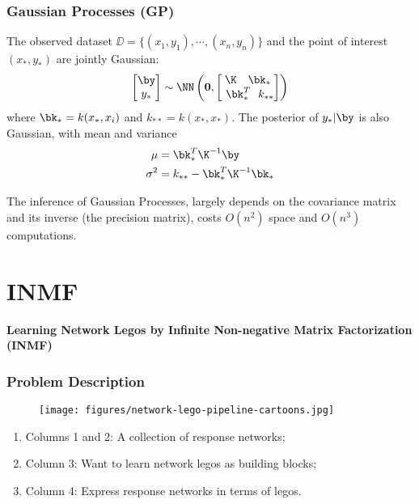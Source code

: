 \documentclass{beamer}
\begin{document}
\begin{frame}
\frametitle{Gaussian Processes (GP)}
The observed dataset $\DD = \{(x_1,y_1),\cdots,(x_n,y_n)\}$ and the point of interest $(x_*,y_*)$ are jointly Gaussian:
\begin{align}
	\begin{bmatrix}\by\\y_*\end{bmatrix} \sim \NN \left( \mathbf{0}, \begin{bmatrix}\K ~~~ \bk_*\\~\bk_*^T ~~k_{**}\end{bmatrix} \right)
\end{align}
where $\bk_* = k(x_*,x_i)$ and $k_{**} = k(x_*,x_*)$. The posterior of $y_*|\by$ is also Gaussian, with mean and variance
\begin{align}
	\mu &= \bk_*^T\K^{-1}\by\\
	\sigma^2 &= k_{**} - \bk_*^T\K^{-1}\bk_*
\end{align}

The inference of Gaussian Processes, largely depends on the covariance matrix and its inverse (the precision matrix), costs $O(n^2)$ space and $O(n^3)$ computations.
\end{frame}



\section{INMF}

\begin{frame}
\begin{center}
{\bf{Learning Network Legos by Infinite Non-negative Matrix Factorization (INMF)}}
\end{center}
\end{frame}

\begin{frame}
\frametitle{Problem Description}

\begin{figure}[c]
  \texttt{[image: figures/network-lego-pipeline-cartoons.jpg]}
\end{figure}

\begin{enumerate}
	\item Columns 1 and 2: A collection of response networks;
    \item Column 3: Want to learn network legos as building blocks;
    \item Column 4: Express response networks in terms of legos.
\end{enumerate}

\end{frame}
\end{document}
